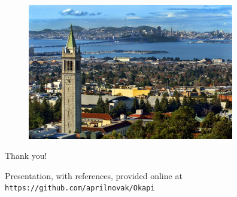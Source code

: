 \documentclass[10pt]{beamer}
\begin{document}
\begin{frame}
\begin{figure}
\includegraphics[width=9cm]{../Figures/berkeley.jpg}
\end{figure}
\centering
Thank you!
\vfill

\footnotesize
Presentation, with references, provided online at {\tt https://github.com/aprilnovak/Okapi}

\footnotesize
\color{white}\cite{mori,waata,seker,espel,sanchez,cardoni,ivanov,travleev,espel_2013,ivanov_2013,daeubler,ivanov_2014,daeubler_2015,henry,aviles,li_2013,suikkanen,wu,hu,vazquez,meplan,aufiero,aufiero_2017,krolikowski,aufiero_2016,pham,novak,guo,scarlat,yexin,gurecky,sjenitzer,breitkreutz,gill,erfaninia,bennett,gourbesville,guo_2013,hoogenboom,kelly,laureau,smure,pecchia,shan,li_2012,kotlyar_2011, tuominen, guo_2018, cui, chen}
\color{black}
\end{frame}

\appendix

\begin{frame}[allowframebreaks]
\footnotesize


\end{frame}
\end{document}

